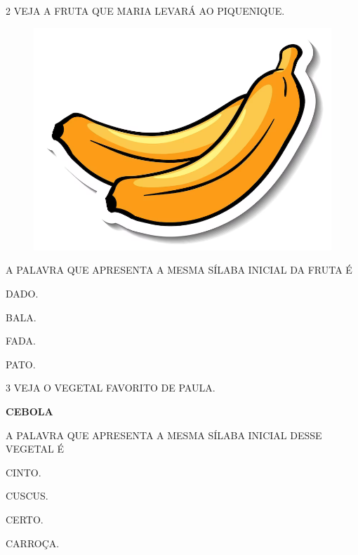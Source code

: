 \num{2} VEJA A FRUTA QUE MARIA LEVARÁ AO PIQUENIQUE.

\begin{figure}[H]
\centering
\includegraphics[width=.\textwidth]{./media/image72.png}
\end{figure}

A PALAVRA QUE APRESENTA A MESMA SÍLABA INICIAL DA FRUTA É

\begin{escolha}

\item DADO.

\item BALA.

\item FADA.

\item PATO.

\end{escolha}

\num{3} VEJA O VEGETAL FAVORITO DE PAULA.

\begin{center}
\textbf{CEBOLA}
\end{center}

A PALAVRA QUE APRESENTA A MESMA SÍLABA INICIAL DESSE VEGETAL É

\begin{escolha}

\item CINTO.

\item CUSCUS.

\item CERTO.

\item CARROÇA.

\end{escolha}

